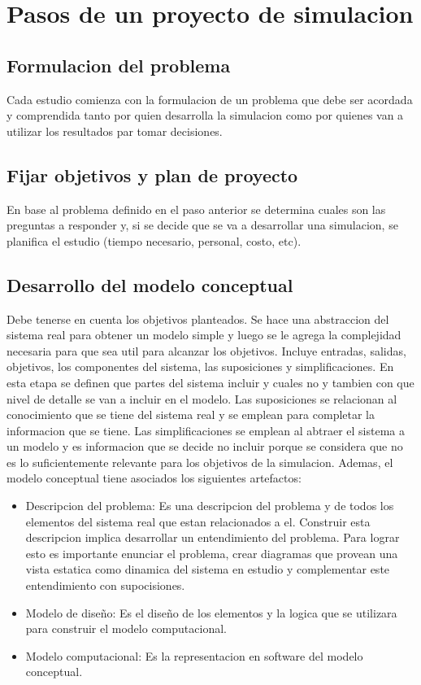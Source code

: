 \documentclass[a4paper]{article}
\begin{document}
\section*{Pasos de un proyecto de simulacion}
\subsection*{Formulacion del problema}
Cada estudio comienza con la formulacion de un problema que debe ser acordada
y comprendida tanto por quien desarrolla la simulacion como por quienes van 
a utilizar los resultados par tomar decisiones.

\subsection*{Fijar objetivos y plan de proyecto}
En base al problema definido en el paso anterior se determina cuales son las 
preguntas a responder y, si se decide que se va a desarrollar una simulacion,
se planifica el estudio (tiempo necesario, personal, costo, etc).

\subsection*{Desarrollo del modelo conceptual}
Debe tenerse en cuenta los objetivos planteados. Se hace una abstraccion del 
sistema real para obtener un modelo simple y luego se le agrega la complejidad 
necesaria para que sea util para alcanzar los objetivos.
Incluye entradas, salidas, objetivos, los componentes del sistema, las suposiciones
y simplificaciones. En esta etapa se definen que partes del sistema incluir y cuales 
no y tambien con que nivel de detalle se van a incluir en el modelo.
Las suposiciones se relacionan al conocimiento que se tiene del sistema real y se 
emplean para completar la informacion que se tiene. Las simplificaciones se 
emplean al abtraer el sistema a un modelo y es informacion que se decide no incluir
porque se considera que no es lo suficientemente relevante para los objetivos de la simulacion.
Ademas, el modelo conceptual tiene asociados los siguientes artefactos:

\begin{itemize}
    \item Descripcion del problema: Es una descripcion del problema y de todos los elementos del sistema real 
    que estan relacionados a el. Construir esta descripcion implica desarrollar un entendimiento del problema.
    Para lograr esto es importante enunciar el problema, crear diagramas que provean una vista estatica como 
    dinamica del sistema en estudio y complementar este entendimiento con supocisiones.
    \item Modelo de diseño: Es el diseño de los elementos y la logica que se utilizara para construir 
    el modelo computacional.
    \item Modelo computacional: Es la representacion en software del modelo conceptual.
\end{itemize}
\end{document}
